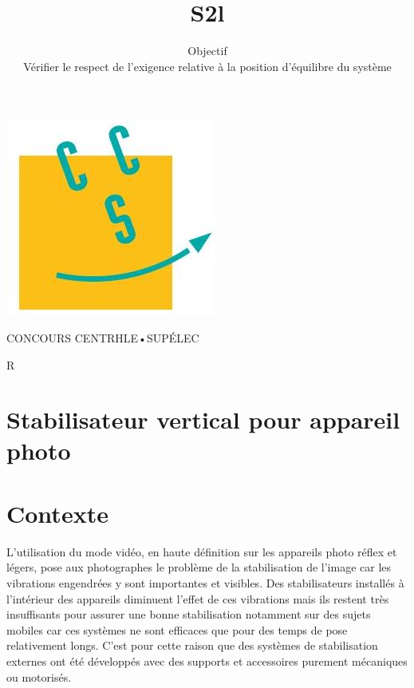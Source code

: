 \documentclass[10pt]{article}
\title{S2l }
\author{Objectif\\
Vérifier le respect de l'exigence relative à la position d'équilibre du système}
\date{}
\begin{document}
\maketitle
\begin{center}
\includegraphics[max width=\textwidth]{2022_12_31_ed674c1a831ea1bff3a0g-01}
\end{center}

CONCOURS CENTRHLE•SUPÉLEC

R

\section{Stabilisateur vertical pour appareil photo}
\section{Contexte}
L'utilisation du mode vidéo, en haute définition sur les appareils photo réflex et légers, pose aux photographes le problème de la stabilisation de l'image car les vibrations engendrées y sont importantes et visibles. Des stabilisateurs installés à l'intérieur des appareils diminuent l'effet de ces vibrations mais ils restent très insuffisants pour assurer une bonne stabilisation notamment sur des sujets mobiles car ces systèmes ne sont efficaces que pour des temps de pose relativement longs. C'est pour cette raison que des systèmes de stabilisation externes ont été développés avec des supports et accessoires purement mécaniques ou motorisés.
\end{document}
